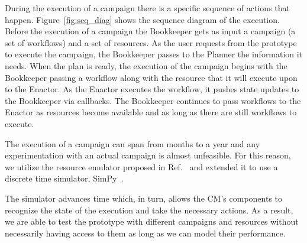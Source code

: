 During the execution of a campaign there is a specific sequence of actions that happen.
Figure~\ref{fig:seq_diag} shows the sequence diagram of the execution.
Before the execution of a campaign the Bookkeeper gets as input a campaign (a set of workflows) and a set of resources.
As the user requests from the prototype to execute the campaign, the Bookkeeper passes to the Planner the information it needs.
When the plan is ready, the execution of the campaign begins with the Bookkeeper passing a workflow along with the resource that it will execute upon to the Enactor.
As the Enactor executes the workflow, it pushes state updates to the Bookkeeper via callbacks.
The Bookkeeper continues to pass workflows to the Enactor as resources become available and as long as there are still workflows to execute.

The execution of a campaign can span from months to a year and any experimentation with an actual campaign is almost unfeasible.
For this reason, we utilize the resource emulator proposed in Ref.~\cite{balasubramanian2019programming} and extended it to use a discrete time simulator, SimPy~\cite{simpy}.

The simulator advances time which, in turn, allows the CM's components to recognize the state of the execution and take the necessary actions.
As a result, we are able to test the prototype with different campaigns and resources without necessarily having access to them as long as we can model their performance.

